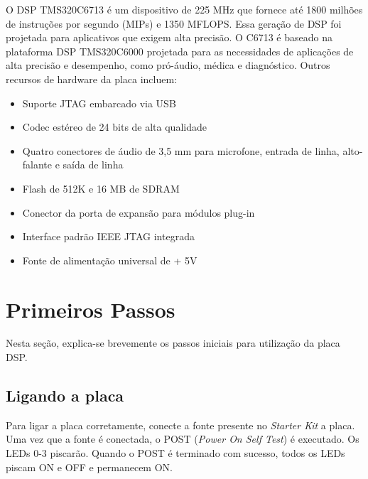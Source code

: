 \documentclass[a4paper, 12pt]{article}
\begin{document}
O DSP TMS320C6713 é um dispositivo de 225 MHz que fornece até 1800 milhões de instruções por segundo (MIPs) e 1350 MFLOPS. Essa geração de DSP foi projetada para aplicativos que exigem alta precisão. O C6713 é baseado na plataforma DSP TMS320C6000 projetada para as necessidades de aplicações de alta precisão e desempenho, como pró-áudio, médica e diagnóstico. Outros recursos de hardware da placa incluem:

\begin{itemize}
	\item Suporte JTAG embarcado via USB
	\item Codec estéreo de 24 bits de alta qualidade
	\item Quatro conectores de áudio de 3,5 mm para microfone, entrada de linha, alto-falante e saída de linha
	\item Flash de 512K e 16 MB de SDRAM
	\item Conector da porta de expansão para módulos plug-in
	\item Interface padrão IEEE JTAG integrada 
	\item Fonte de alimentação universal de + 5V
\end{itemize}


\newpage
\section{Primeiros Passos}

Nesta seção, explica-se brevemente os passos iniciais para utilização da placa DSP.


\subsection{Ligando a placa}

Para ligar a placa corretamente, conecte a fonte presente no \textit{Starter Kit} a placa. Uma vez que a fonte é conectada, o POST (\textit{Power On Self Test}) é executado. Os LEDs 0-3 piscarão. Quando o POST é terminado com sucesso, todos os LEDs piscam ON e OFF e permanecem ON.
\end{document}
